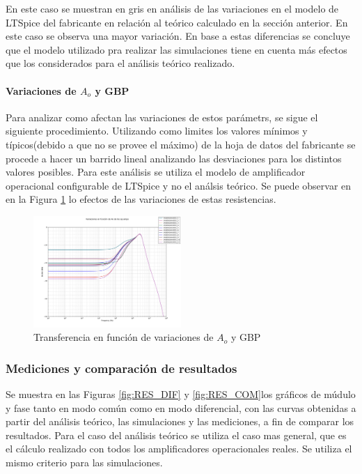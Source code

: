 En este caso se muestran en gris en an\'alisis de las variaciones en el modelo de LTSpice del fabricante en relaci\'on al te\'orico calculado en la secci\'on anterior. En este caso se observa una mayor variaci\'on. En base a estas diferencias se concluye que el modelo utilizado pra realizar las simulaciones tiene en cuenta m\'as efectos que los considerados para el an\'alisis te\'orico realizado.
\paragraph{Variaciones de $A_o$ y GBP}
Para analizar como afectan las variaciones de estos par\'ametrs, se sigue el siguiente procedimiento. Utilizando como limites los valores m\'inimos y t\'ipicos(debido a que no se provee el m\'aximo) de la hoja de datos del fabricante se procede a hacer un barrido lineal analizando las desviaciones para los distintos valores posibles.
Para este an\'alisis se utiliza el modelo de amplificador operacional configurable de LTSpice y no el an\'alsis te\'orico.
Se puede observar en en la Figura \ref{fig:VAR_AoyGBP} lo efectos de las variaciones de estas resistencias.
\begin{figure}[H]

    \centering
    \includegraphics[width=0.5\textwidth]{../EJ3/Recursos/VAR_Ao}
    \caption{Transferencia en funci\'on de variaciones de $A_o$ y GBP}
    \label{fig:VAR_AoyGBP}
\end{figure}


\subsubsection{Mediciones y comparaci\'on de resultados}

Se muestra en las Figuras \ref{fig:RES_DIF} y \ref{fig:RES_COM}los gr\'aficos de m\'udulo y fase tanto en modo com\'un como en modo diferencial, con las curvas obtenidas a partir del an\'alisis te\'orico, las simulaciones y las mediciones, a fin de comparar los resultados.
Para el caso del an\'alisis te\'orico se utiliza el caso mas general, que es el c\'alculo realizado con todos los amplificadores operacionales reales. Se utiliza el mismo criterio para las simulaciones.

